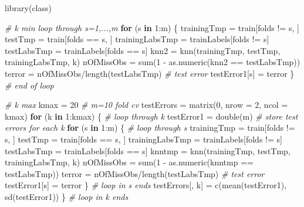 \documentclass[
  11pt,
]{article}
\newenvironment{Shaded}{\begin{snugshade}}{\end{snugshade}}
\newcommand{\AttributeTok}[1]{\textcolor[rgb]{0.77,0.63,0.00}{#1}}
\newcommand{\CommentTok}[1]{\textcolor[rgb]{0.56,0.35,0.01}{\textit{#1}}}
\newcommand{\ControlFlowTok}[1]{\textcolor[rgb]{0.13,0.29,0.53}{\textbf{#1}}}
\newcommand{\DecValTok}[1]{\textcolor[rgb]{0.00,0.00,0.81}{#1}}
\newcommand{\FunctionTok}[1]{\textcolor[rgb]{0.00,0.00,0.00}{#1}}
\newcommand{\NormalTok}[1]{#1}
\newcommand{\OtherTok}[1]{\textcolor[rgb]{0.56,0.35,0.01}{#1}}
\newcommand{\SpecialCharTok}[1]{\textcolor[rgb]{0.00,0.00,0.00}{#1}}
\begin{document}
\begin{Shaded}
\begin{Highlighting}[]
\FunctionTok{library}\NormalTok{(class)}

\CommentTok{\# k min loop through s=1,...,m}
\ControlFlowTok{for}\NormalTok{ (s }\ControlFlowTok{in} \DecValTok{1}\SpecialCharTok{:}\NormalTok{m) \{}
\NormalTok{    trainingTmp }\OtherTok{=}\NormalTok{ train[folds }\SpecialCharTok{!=}\NormalTok{ s, ]}
\NormalTok{    testTmp }\OtherTok{=}\NormalTok{ train[folds }\SpecialCharTok{==}\NormalTok{ s, ]}
\NormalTok{    trainingLabsTmp }\OtherTok{=}\NormalTok{ trainLabels[folds }\SpecialCharTok{!=}\NormalTok{ s]}
\NormalTok{    testLabsTmp }\OtherTok{=}\NormalTok{ trainLabels[folds }\SpecialCharTok{==}\NormalTok{ s]}
\NormalTok{    knn2 }\OtherTok{=} \FunctionTok{knn}\NormalTok{(trainingTmp, testTmp, trainingLabsTmp, k)}
\NormalTok{    nOfMissObs }\OtherTok{=} \FunctionTok{sum}\NormalTok{(}\DecValTok{1} \SpecialCharTok{{-}} \FunctionTok{as.numeric}\NormalTok{(knn2 }\SpecialCharTok{==}\NormalTok{ testLabsTmp))}
\NormalTok{    terror }\OtherTok{=}\NormalTok{ nOfMissObs}\SpecialCharTok{/}\FunctionTok{length}\NormalTok{(testLabsTmp)  }\CommentTok{\# test error}
\NormalTok{    testError1[s] }\OtherTok{=}\NormalTok{ terror}
\NormalTok{\}  }\CommentTok{\# end of loop}

\CommentTok{\# k max}
\NormalTok{kmax }\OtherTok{=} \DecValTok{20}  \CommentTok{\# m=10 fold cv}
\NormalTok{testErrors }\OtherTok{=} \FunctionTok{matrix}\NormalTok{(}\DecValTok{0}\NormalTok{, }\AttributeTok{nrow =} \DecValTok{2}\NormalTok{, }\AttributeTok{ncol =}\NormalTok{ kmax)}
\ControlFlowTok{for}\NormalTok{ (k }\ControlFlowTok{in} \DecValTok{1}\SpecialCharTok{:}\NormalTok{kmax) \{}
    \CommentTok{\# loop through k}
\NormalTok{    testError1 }\OtherTok{=} \FunctionTok{double}\NormalTok{(m)  }\CommentTok{\# store test errors for each k}
    \ControlFlowTok{for}\NormalTok{ (s }\ControlFlowTok{in} \DecValTok{1}\SpecialCharTok{:}\NormalTok{m) \{}
        \CommentTok{\# loop through s}
\NormalTok{        trainingTmp }\OtherTok{=}\NormalTok{ train[folds }\SpecialCharTok{!=}\NormalTok{ s, ]}
\NormalTok{        testTmp }\OtherTok{=}\NormalTok{ train[folds }\SpecialCharTok{==}\NormalTok{ s, ]}
\NormalTok{        trainingLabsTmp }\OtherTok{=}\NormalTok{ trainLabels[folds }\SpecialCharTok{!=}\NormalTok{ s]}
\NormalTok{        testLabsTmp }\OtherTok{=}\NormalTok{ trainLabels[folds }\SpecialCharTok{==}\NormalTok{ s]}
\NormalTok{        knntmp }\OtherTok{=} \FunctionTok{knn}\NormalTok{(trainingTmp, testTmp, trainingLabsTmp, k)}
\NormalTok{        nOfMissObs }\OtherTok{=} \FunctionTok{sum}\NormalTok{(}\DecValTok{1} \SpecialCharTok{{-}} \FunctionTok{as.numeric}\NormalTok{(knntmp }\SpecialCharTok{==}\NormalTok{ testLabsTmp))}
\NormalTok{        terror }\OtherTok{=}\NormalTok{ nOfMissObs}\SpecialCharTok{/}\FunctionTok{length}\NormalTok{(testLabsTmp)  }\CommentTok{\# test error}
\NormalTok{        testError1[s] }\OtherTok{=}\NormalTok{ terror}
\NormalTok{    \}  }\CommentTok{\# loop in s ends}
\NormalTok{    testErrors[, k] }\OtherTok{=} \FunctionTok{c}\NormalTok{(}\FunctionTok{mean}\NormalTok{(testError1), }\FunctionTok{sd}\NormalTok{(testError1))}
\NormalTok{\}  }\CommentTok{\# loop in k ends}


\end{Highlighting}
\end{Shaded}
\end{document}
